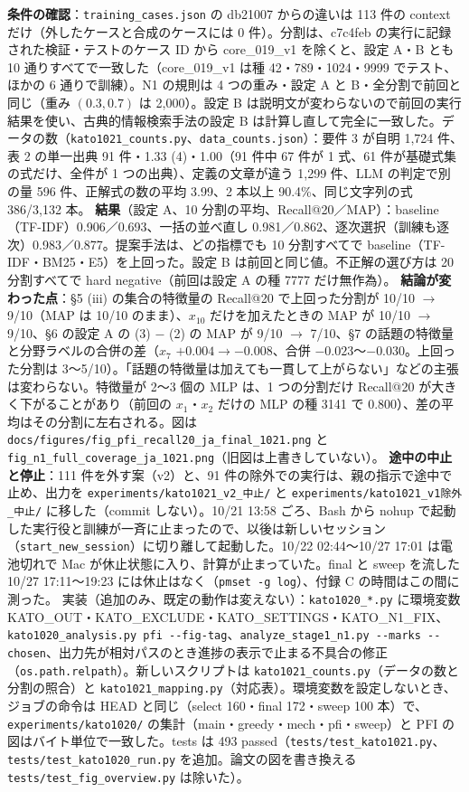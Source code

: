 \documentclass[11pt,a4paper]{jsarticle}
\begin{document}
\begin{itemize}[nosep]
    \textbf{条件の確認}：\texttt{training\_cases.json} の db21007 からの違いは 113 件の context だけ（外したケースと合成のケースには 0 件）。分割は、c7c4feb の実行に記録された検証・テストのケース ID から core\_019\_v1 を除くと、設定 A・B とも 10 通りすべてで一致した（core\_019\_v1 は種 42・789・1024・9999 でテスト、ほかの 6 通りで訓練）。N1 の規則は 4 つの重み・設定 A と B・全分割で前回と同じ（重み $(0.3, 0.7)$ は 2{,}000）。設定 B は説明文が変わらないので前回の実行結果を使い、古典的情報検索手法の設定 B は計算し直して完全に一致した。データの数（\texttt{kato1021\_counts.py}、\texttt{data\_counts.json}）：要件 3 が自明 1{,}724 件、表 2 の単一出典 91 件・1.33 (4)・1.00（91 件中 67 件が 1 式、61 件が基礎式集の式だけ、全件が 1 つの出典）、定義の文章が違う 1{,}299 件、LLM の判定で別の量 596 件、正解式の数の平均 3.99、2 本以上 90.4\%、同じ文字列の式 386/3{,}132 本。
    \textbf{結果}（設定 A、10 分割の平均、Recall@20／MAP）：baseline（TF-IDF）0.906／0.693、一括の並べ直し 0.981／0.862、逐次選択（訓練も逐次）0.983／0.877。提案手法は、どの指標でも 10 分割すべてで baseline（TF-IDF・BM25・E5）を上回った。設定 B は前回と同じ値。不正解の選び方は 20 分割すべてで hard negative（前回は設定 A の種 7777 だけ無作為）。
    \textbf{結論が変わった点}：\S 5 (iii) の集合の特徴量の Recall@20 で上回った分割が 10/10 $\to$ 9/10（MAP は 10/10 のまま）、$x_{10}$ だけを加えたときの MAP が 10/10 $\to$ 9/10、\S 6 の設定 A の (3) $-$ (2) の MAP が 9/10 $\to$ 7/10、\S 7 の話題の特徴量と分野ラベルの合併の差（$x_7$ $+0.004 \to -0.008$、合併 $-0.023$〜$-0.030$。上回った分割は 3〜5/10）。「話題の特徴量は加えても一貫して上がらない」などの主張は変わらない。特徴量が 2〜3 個の MLP は、1 つの分割だけ Recall@20 が大きく下がることがあり（前回の $x_1$・$x_2$ だけの MLP の種 3141 で 0.800）、差の平均はその分割に左右される。図は \texttt{docs/figures/fig\_pfi\_recall20\_ja\_final\_1021.png} と \texttt{fig\_n1\_full\_coverage\_ja\_1021.png}（旧図は上書きしていない）。
    \textbf{途中の中止と停止}：111 件を外す案（v2）と、91 件の除外での実行は、親の指示で途中で止め、出力を \texttt{experiments/kato1021\_v2\_中止/} と \texttt{experiments/kato1021\_v1除外\_中止/} に移した（commit しない）。10/21 13:58 ごろ、Bash から nohup で起動した実行役と訓練が一斉に止まったので、以後は新しいセッション（\texttt{start\_new\_session}）に切り離して起動した。10/22 02:44〜10/27 17:01 は電池切れで Mac が休止状態に入り、計算が止まっていた。final と sweep を流した 10/27 17:11〜19:23 には休止はなく（\texttt{pmset -g log}）、付録 C の時間はこの間に測った。
    実装（追加のみ、既定の動作は変えない）：\texttt{kato1020\_*.py} に環境変数 KATO\_OUT・KATO\_EXCLUDE・KATO\_SETTINGS・KATO\_N1\_FIX、\texttt{kato1020\_analysis.py pfi -{}-fig-tag}、\texttt{analyze\_stage1\_n1.py -{}-marks -{}-chosen}、出力先が相対パスのとき進捗の表示で止まる不具合の修正（\texttt{os.path.relpath}）。新しいスクリプトは \texttt{kato1021\_counts.py}（データの数と分割の照合）と \texttt{kato1021\_mapping.py}（対応表）。環境変数を設定しないとき、ジョブの命令は HEAD と同じ（select 160・final 172・sweep 100 本）で、\texttt{experiments/kato1020/} の集計（main・greedy・mech・pfi・sweep）と PFI の図はバイト単位で一致した。tests は 493 passed（\texttt{tests/test\_kato1021.py}、\texttt{tests/test\_kato1020\_run.py} を追加。論文の図を書き換える \texttt{tests/test\_fig\_overview.py} は除いた）。

\end{itemize}
\end{document}

